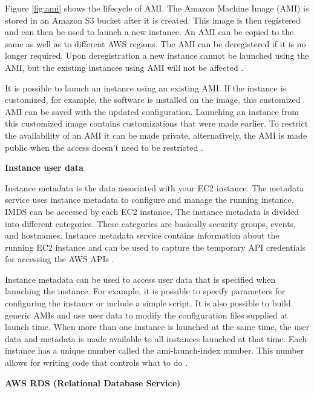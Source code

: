 \par Figure \ref{fig:ami} shows the lifecycle of AMI. The
Amazon Machine Image (AMI) is stored in an Amazon S3
bucket after it is created.
This image is then registered and can then be used to launch a new instance. An AMI can be
copied to the same as well as to different AWS regions.
The AMI can be deregistered if it is no longer required.
Upon deregistration a new instance cannot be launched
using the AMI, but the existing instances using AMI will
not be affected \cite{32}.

\par It is possible to launch an instance using an existing AMI. If the instance is customized, for example, the
software is installed on the image, this customized AMI can be saved with the updated configuration. Launching an
instance from this customized image contains customizations that were made earlier. To restrict the availability of
an AMI it can be made private, alternatively, the AMI is
made public when the access doesn’t need to be restricted \cite{33}.


\hfill \break

\textbf{Instance user data}
\par Instance metadata is the data associated with your EC2 instance.
The metadata service uses instance metadata to
configure
and
manage
the
running instance.
IMDS can be accessed by each EC2 instance.
The instance metadata is divided into different
categories.
These categories are basically security
groups, events,
and hostnames.
Instance metadata service contains information
about the running EC2 instance and can be used to capture the temporary API credentials for accessing the AWS APIs \cite{34}.

\par Instance metadata can be used to access user data that is specified when launching the instance. For example, it
is possible to specify parameters for configuring the instance or include a simple script. It is also possible to
build generic AMIs and use user data to modify the configuration files supplied at launch time.
When more than one instance is launched at the same time,
the user data and metadata is made available to all
instances launched at that time.
Each instance has a unique number called the ami-launch-index number.
This number allows for writing code that controls what to
do \cite{34}.


\hfill \break

\textbf{AWS RDS (Relational Database Service)}

